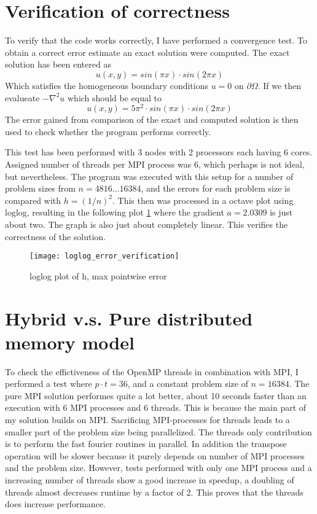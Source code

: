 \section{Verification of correctness}
To verify that the code works correctly, I have performed a convergence test. To obtain a correct error estimate an exact solution were computed. The exact solution has been entered as 
\begin{equation}
	u(x,y) = sin(\pi x) \cdot sin(2\pi x)
\end{equation}
Which satisfies the homogeneous boundary conditions $u = 0 \text{ on } \partial\Omega$. If we then evalueate $-\nabla^2 u$ which should be equal to 
\begin{equation}
	u(x,y) = 5\pi^2 \cdot sin(\pi x) \cdot sin(2\pi x)
\end{equation}
The error gained from comparison of the exact and computed solution is then used to check whether the program performs correctly.

This test has been performed with 3 nodes with 2 processors each having 6 cores. Assigned number of threads per MPI process was 6, which perhaps is not ideal, but nevertheless. The program was executed with this setup for a number of problem sizes from $n=4 8 16 ...16384$, and the errors for each problem size is compared with $h=(1 / n)^2$. This then was processed in a octave plot using loglog, resulting in the following plot \ref{fig:loglogerror} where the gradient $a = 2.0309$ is just about two. The graph is also just about completely linear. This verifies the correctness of the solution. 

\begin{figure}[H]
	\centering
	\texttt{[image: loglog\_error\_verification]}
	\caption{loglog plot of h, max pointwise error}
	\label{fig:loglogerror}
\end{figure}

\section{Hybrid v.s. Pure distributed memory model}
To check the effictiveness of the OpenMP threads in combination with MPI, I performed a test where $p\cdot t = 36$, and a constant problem size of $n = 16384$. The pure MPI solution performes quite a lot better, about 10 seconds faster than an execution with 6 MPI processes and 6 threads. This is because the main part of my solution builds on MPI. Sacrificing MPI-processes for threads leads to a smaller part of the problem size being parallelized. The threads only contribution is to perform the fast fourier routines in parallel. In addition the transpose operation will be slower because it purely depends on number of MPI processes and the problem size. 
However, tests performed with only one MPI process and a increasing number of threads show a good increase in speedup, a doubling of threads almost decreases runtime by a factor of 2. This proves that the threads does increase performance.

